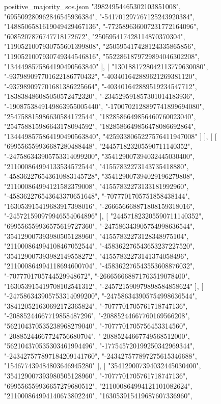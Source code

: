 \begin{filecontents*}[overwrite]{positive_majority_sos.json}
    "39824954465302103851008",
    "695509280962846545936384",
    "-541701297767125243920384",
    "1488506581619049429467136",
    "-772589636007231772164096",
    "6085207876747718172672",
    "250595417428114870370304",
    "1190521007930755601399808",
    "250595417428124335865856",
    "1190521007930749344546816",
    "5522861879729894046302208",
    "1344498575864190490563840"
   ],
   [
    "1301881728042113779630080",
    "-937989097701622186770432",
    "-403401642889621269381120",
    "-937989097701681386225664",
    "-403401642889519234547712",
    "183838486085050572472320",
    "-234529591857301014183936",
    "-1908753849149863955005440",
    "-1700702128897741899694080",
    "254758815986630584172544",
    "1828586649856460760023040",
    "254758815986643178094592",
    "1828586649856478086692864",
    "1344498575864190490563840",
    "4259338065227576411947008"
   ]
  ],
  [
   [
    "699556559936687280488448",
    "244571823205590711140352",
    "-247586343905753314099200",
    "354129007394032445030400",
    "211000864994133534572544",
    "41557832273143735418880",
    "-458362276543610883145728",
    "354129007394029196279808",
    "211000864994121582379008",
    "41557832273133181992960",
    "-458362276543643370651648",
    "-7077701705751858438144",
    "163053915419683917398016",
    "-266656668871808159318016",
    "-245721590979946554064896"
   ],
   [
    "244571823205590711140352",
    "699556559936575619727360",
    "-247586343905754998636544",
    "354129007393980505128960",
    "41557832273128348975104",
    "211000864994108467052544",
    "-458362276543653237227520",
    "354129007393982149558272",
    "41557832273141374058496",
    "211000864994118694600704",
    "-458362276543553608876032",
    "-7077701705744529948672",
    "-266656668871763519078400",
    "163053915419708102541312",
    "-245721590979898584858624"
   ],
   [
    "-247586343905753314099200",
    "-247586343905754998636544",
    "384120521630692172365824",
    "-7077701705761718747136",
    "-20885244667719858487296",
    "-20885244667760169566208",
    "562104370535238968279040",
    "-7077701705756453314560",
    "-20885244667724756680704",
    "-20885244667749568512000",
    "562104370535303461994496",
    "-177545720199250342969344",
    "-243427577897184209141760",
    "-243427577897275615346688",
    "154677439484803646945280"
   ],
   [
    "354129007394032445030400",
    "354129007393980505128960",
    "-7077701705761718747136",
    "699556559936657279680512",
    "211000864994121101082624",
    "211000864994140673802240",
    "163053915419687607336960",

\end{filecontents*}
